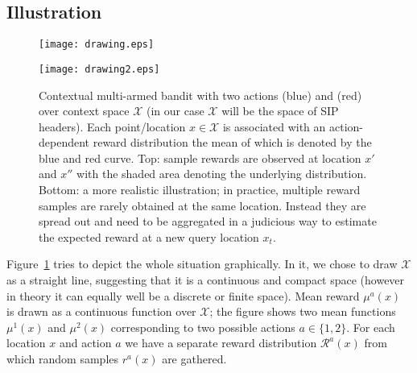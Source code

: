 \documentclass{llncs}
\begin{document}
\subsection{Illustration} 


\begin{figure}[!t]
\begin{center}
		\texttt{[image: drawing.eps]}	\\ \medskip
			
		\texttt{[image: drawing2.eps]}
\end{center}		
\caption{Contextual multi-armed bandit with two actions (blue) and (red) over context 
space $\mathcal X$ (in our case $\mathcal X$ will be the space of SIP headers). 
Each point/location $x \in \mathcal X$ is associated with an action-dependent reward 
distribution the mean of which is denoted by the blue and red curve. Top: sample rewards are
observed at location $x'$ and $x''$ with the shaded area denoting the underlying distribution.
Bottom: a more realistic illustration; in practice, multiple reward samples are rarely obtained 
at the same location. Instead they are spread out and need to be aggregated in a judicious way
to estimate the expected reward at a new query location $x_t$.}
\label{fig:drawing}
\end{figure}
Figure~\ref{fig:drawing} tries to depict the whole situation graphically. In it, we chose to
draw $\mathcal X$ as a straight line, suggesting that it is a continuous and
compact space (however in theory it can equally well be a discrete or finite
space). Mean reward $\mu^a(x)$ is drawn as a continuous function over $\mathcal X$;
the figure shows two mean functions $\mu^1(x)$ and $\mu^2(x)$ corresponding
to two possible actions $a \in \{1,2\}$. For each location $x$ and action $a$
we have a separate reward distribution $\mathcal R^a(x)$ from which 
random samples $r^a(x)$ are gathered.
\end{document}
